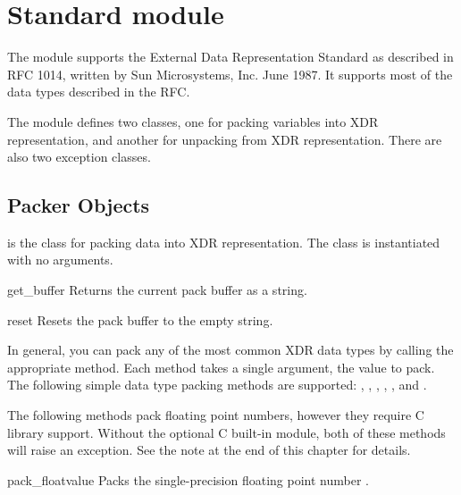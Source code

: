 \section{Standard module }
\label{module-xdrlib}

\renewcommand{\indexsubitem}{(in module xdrlib)}


The  module supports the External Data Representation
Standard as described in RFC 1014, written by Sun Microsystems,
Inc. June 1987.  It supports most of the data types described in the
RFC.

The  module defines two classes, one for packing
variables into XDR representation, and another for unpacking from XDR
representation.  There are also two exception classes.


\subsection{Packer Objects}

 is the class for packing data into XDR representation.
The  class is instantiated with no arguments.

\begin{funcdesc}{get_buffer}{}
Returns the current pack buffer as a string.
\end{funcdesc}

\begin{funcdesc}{reset}{}
Resets the pack buffer to the empty string.
\end{funcdesc}

In general, you can pack any of the most common XDR data types by
calling the appropriate  method.  Each method
takes a single argument, the value to pack.  The following simple data
type packing methods are supported: , ,
, , ,
and .

The following methods pack floating point numbers, however they
require C library support.  Without the optional C built-in module,
both of these methods will raise an 
exception.  See the note at the end of this chapter for details.

\begin{funcdesc}{pack_float}{value}
Packs the single-precision floating point number .
\end{funcdesc}

